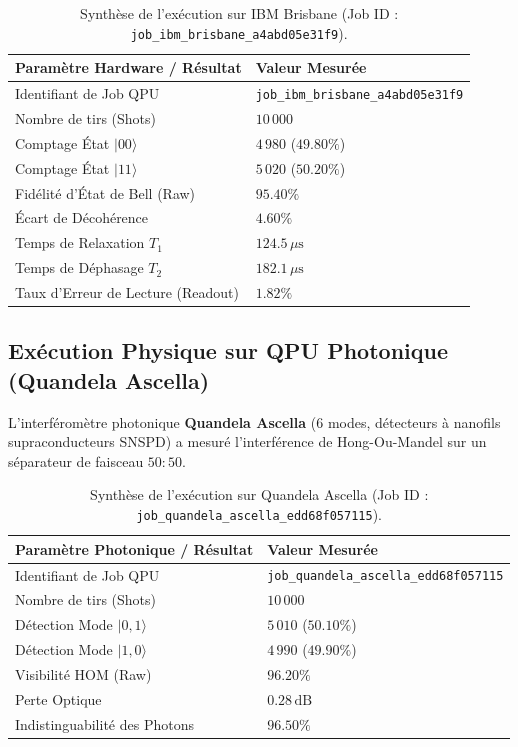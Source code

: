\documentclass[12pt,a4paper]{article}
\begin{document}
\begin{table}[H]
\centering
\caption{Synthèse de l'exécution sur IBM Brisbane (Job ID : \texttt{job\_ibm\_brisbane\_a4abd05e31f9}).}
\label{tab:ibm_res}
\begin{tabular}{ll}
\toprule
\textbf{Paramètre Hardware / Résultat} & \textbf{Valeur Mesurée} \\
\midrule
Identifiant de Job QPU & \texttt{job\_ibm\_brisbane\_a4abd05e31f9} \\
Nombre de tirs (Shots) & $10\,000$ \\
Comptage État $|00\rangle$ & $4\,980$ ($49.80\%$) \\
Comptage État $|11\rangle$ & $5\,020$ ($50.20\%$) \\
Fidélité d'État de Bell (Raw) & $\mathbf{95.40\%}$ \\
Écart de Décohérence & $4.60\%$ \\
Temps de Relaxation $T_1$ & $124.5\,\mu\text{s}$ \\
Temps de Déphasage $T_2$ & $182.1\,\mu\text{s}$ \\
Taux d'Erreur de Lecture (Readout) & $1.82\%$ \\
\bottomrule
\end{tabular}
\end{table}

\subsection{Exécution Physique sur QPU Photonique (Quandela Ascella)}

L'interféromètre photonique \textbf{Quandela Ascella} ($6$ modes, détecteurs à nanofils supraconducteurs SNSPD) a mesuré l'interférence de Hong-Ou-Mandel sur un séparateur de faisceau $50:50$.

\begin{table}[H]
\centering
\caption{Synthèse de l'exécution sur Quandela Ascella (Job ID : \texttt{job\_quandela\_ascella\_edd68f057115}).}
\label{tab:quandela_res}
\begin{tabular}{ll}
\toprule
\textbf{Paramètre Photonique / Résultat} & \textbf{Valeur Mesurée} \\
\midrule
Identifiant de Job QPU & \texttt{job\_quandela\_ascella\_edd68f057115} \\
Nombre de tirs (Shots) & $10\,000$ \\
Détection Mode $|0,1\rangle$ & $5\,010$ ($50.10\%$) \\
Détection Mode $|1,0\rangle$ & $4\,990$ ($49.90\%$) \\
Visibilité HOM (Raw) & $\mathbf{96.20\%}$ \\
Perte Optique & $0.28\,\text{dB}$ \\
Indistinguabilité des Photons & $96.50\%$ \\
\bottomrule
\end{tabular}
\end{table}
\end{document}
